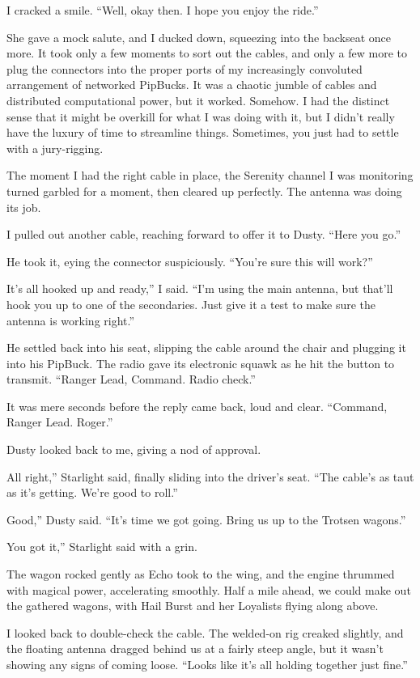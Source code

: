 I cracked a smile. “Well, okay then. I hope you enjoy the ride.”

She gave a mock salute, and I ducked down, squeezing into the backseat once more. It took only a few moments to sort out the cables, and only a few more to plug the connectors into the proper ports of my increasingly convoluted arrangement of networked PipBucks. It was a chaotic jumble of cables and distributed computational power, but it worked. Somehow. I had the distinct sense that it might be overkill for what I was doing with it, but I didn’t really have the luxury of time to streamline things. Sometimes, you just had to settle with a jury-rigging.

The moment I had the right cable in place, the Serenity channel I was monitoring turned garbled for a moment, then cleared up perfectly. The antenna was doing its job.

I pulled out another cable, reaching forward to offer it to Dusty. “Here you go.”

He took it, eying the connector suspiciously. “You’re sure this will work?”

\leavevmode{}It’s all hooked up and ready,” I said. “I’m using the main antenna, but that’ll hook you up to one of the secondaries. Just give it a test to make sure the antenna is working right.”

He settled back into his seat, slipping the cable around the chair and plugging it into his PipBuck. The radio gave its electronic squawk as he hit the button to transmit. “Ranger Lead, Command. Radio check.”

It was mere seconds before the reply came back, loud and clear. “Command, Ranger Lead. Roger.”

Dusty looked back to me, giving a nod of approval.

\leavevmode{}All right,” Starlight said, finally sliding into the driver’s seat. “The cable’s as taut as it’s getting. We’re good to roll.”

\leavevmode{}Good,” Dusty said. “It’s time we got going. Bring us up to the Trotsen wagons.”

\leavevmode{}You got it,” Starlight said with a grin.

The wagon rocked gently as Echo took to the wing, and the engine thrummed with magical power, accelerating smoothly. Half a mile ahead, we could make out the gathered wagons, with Hail Burst and her Loyalists flying along above.

I looked back to double-check the cable. The welded-on rig creaked slightly, and the floating antenna dragged behind us at a fairly steep angle, but it wasn’t showing any signs of coming loose. “Looks like it’s all holding together just fine.”

